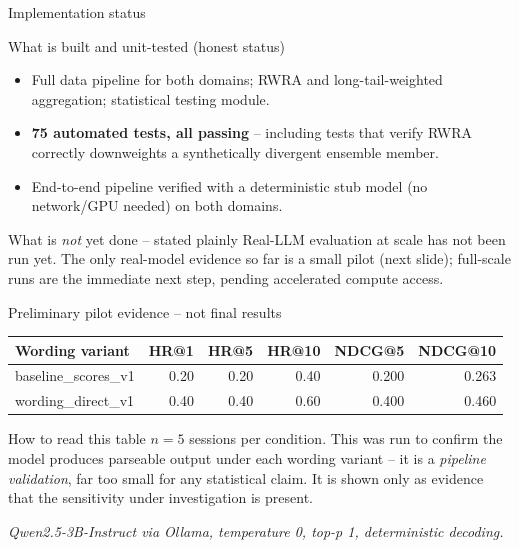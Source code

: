 \documentclass[aspectratio=169,12pt]{beamer}
\newcommand{\source}[1]{\vspace{0.35em}\par{\tiny\color{Muted}\textit{#1}}}
\begin{document}
\begin{frame}{Implementation status}
\begin{block}{What is built and unit-tested (honest status)}
\begin{itemize}
  \item Full data pipeline for both domains; RWRA and long-tail-weighted
        aggregation; statistical testing module.
  \item \textbf{75 automated tests, all passing} -- including tests that
        verify RWRA correctly downweights a synthetically divergent
        ensemble member.
  \item End-to-end pipeline verified with a deterministic stub model
        (no network/GPU needed) on both domains.
\end{itemize}
\end{block}

\vspace{0.4em}
\begin{alertblock}{What is \emph{not} yet done -- stated plainly}
Real-LLM evaluation at scale has not been run yet. The only real-model
evidence so far is a small pilot (next slide); full-scale runs are the
immediate next step, pending accelerated compute access.
\end{alertblock}
\end{frame}

\begin{frame}{Preliminary pilot evidence -- not final results}
\begin{table}
\centering
\small
\begin{tabular}{lrrrrr}
\toprule
\textbf{Wording variant} & \textbf{HR@1} & \textbf{HR@5} & \textbf{HR@10} & \textbf{NDCG@5} & \textbf{NDCG@10}\\
\midrule
baseline\_scores\_v1 & 0.20 & 0.20 & 0.40 & 0.200 & 0.263\\
wording\_direct\_v1 & 0.40 & 0.40 & 0.60 & 0.400 & 0.460\\
\bottomrule
\end{tabular}
\end{table}

\vspace{0.5em}
\begin{alertblock}{How to read this table}
$n{=}5$ sessions per condition. This was run to confirm the model produces
parseable output under each wording variant -- it is a \emph{pipeline
validation}, far too small for any statistical claim. It is shown only as
evidence that the sensitivity under investigation is present.
\end{alertblock}
\source{Qwen2.5-3B-Instruct via Ollama, temperature 0, top-p 1, deterministic decoding.}
\end{frame}
\end{document}
